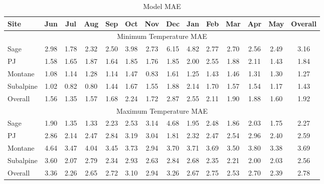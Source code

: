 \documentclass{ametsoc}
\begin{document}
\begin{table}[t]
\caption{Model MAE}
\begin{center}
\begin{tabular}{lccccccccccccc}
\hline\hline
Site      & Jun  & Jul  & Aug  & Sep  & Oct  & Nov  & Dec  & Jan  & Feb  & Mar  & Apr  & May  & Overall \\
\hline
\multicolumn{14}{c}{Minimum Temperature MAE}                                                            \\
Sage      & 2.98 & 1.78 & 2.32 & 2.50 & 3.98 & 2.73 & 6.15 & 4.82 & 2.77 & 2.70 & 2.56 & 2.49 & 3.16    \\
PJ        & 1.58 & 1.65 & 1.87 & 1.64 & 1.85 & 1.76 & 1.85 & 2.00 & 2.55 & 1.88 & 2.11 & 1.43 & 1.84    \\
Montane   & 1.08 & 1.14 & 1.28 & 1.14 & 1.47 & 0.83 & 1.61 & 1.25 & 1.43 & 1.46 & 1.31 & 1.30 & 1.27    \\
Subalpine & 1.02 & 0.82 & 0.80 & 1.44 & 1.67 & 1.55 & 1.88 & 2.14 & 1.70 & 1.57 & 1.54 & 1.17 & 1.43    \\
Overall   & 1.56 & 1.35 & 1.57 & 1.68 & 2.24 & 1.72 & 2.87 & 2.55 & 2.11 & 1.90 & 1.88 & 1.60 & 1.92    \\
\multicolumn{14}{c}{Maximum Temperature MAE}                                                            \\
Sage      & 1.90 & 1.35 & 1.33 & 2.23 & 2.53 & 3.14 & 4.68 & 1.95 & 2.48 & 1.86 & 2.03 & 1.75 & 2.27    \\
PJ        & 2.86 & 2.14 & 2.47 & 2.84 & 3.19 & 3.04 & 1.81 & 2.32 & 2.47 & 2.54 & 2.96 & 2.40 & 2.59    \\
Montane   & 4.64 & 3.47 & 4.04 & 3.45 & 3.73 & 2.94 & 3.70 & 3.71 & 3.69 & 3.50 & 3.80 & 3.38 & 3.69    \\
Subalpine & 3.60 & 2.07 & 2.79 & 2.34 & 2.93 & 2.63 & 2.84 & 2.68 & 2.35 & 2.21 & 2.00 & 2.03 & 2.56    \\
Overall   & 3.36 & 2.26 & 2.65 & 2.72 & 3.10 & 2.94 & 3.26 & 2.67 & 2.75 & 2.53 & 2.70 & 2.39 & 2.78    \\
\hline
\end{tabular}
\end{center}
\end{table}


\end{document}
